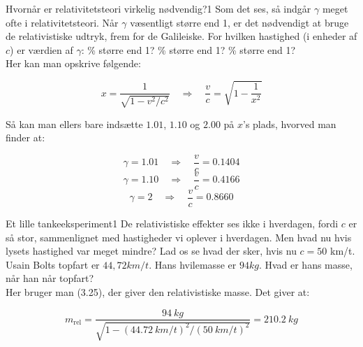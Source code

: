 \begin{opgave}{Hvornår er relativitetsteori virkelig nødvendig?}{1}
	Som det ses, så indgår $\gamma$ meget ofte i relativitetsteori. Når $\gamma$ væsentligt større end 1, er det
	nødvendigt at bruge de relativistiske udtryk, frem for de Galileiske. For hvilken hastighed (i enheder af $c$) er
	værdien af $\gamma$:
	\% større end 1?
	\% større end 1?
	\% større end 1?\\
	
	Her kan man opskrive følgende:
	
	$$x = \frac{1}{\sqrt{1- v^2/c^2}} \quad \Rightarrow \quad \frac{v}{c} = \sqrt{1- \frac{1}{x^2}}$$
	
	
	\noindent
	Så kan man ellers bare indsætte $1.01$, $1.10$ og $2.00$ på $x$'s plads, hvorved man finder at:
	
	$$\gamma = 1.01 \quad \Rightarrow \quad \frac{v}{c} = 0.1404 $$
	$$\gamma = 1.10 \quad \Rightarrow \quad \frac{v}{c} = 0.4166 $$
	$$\gamma = 2 \quad \Rightarrow \quad \frac{v}{c} = 0.8660 $$
\end{opgave}

\begin{opgave}{Et lille tankeeksperiment}{1}
	De relativistiske effekter ses ikke i hverdagen, fordi $c$ er så stor, sammenlignet med hastigheder vi oplever i
	hverdagen. Men hvad nu hvis lysets hastighed var meget mindre? Lad os se hvad der sker, hvis nu $c = 50$
	km/t.
	\opg Usain Bolts topfart er $44,72 \si{km/t}$. Hans hvilemasse er $94 \si{kg}$. Hvad er hans masse, når han når
	topfart?\\
	
	Her bruger man (3.25), der giver den relativistiske masse. Det giver at:
	
	$$m_{\text{rel}} = \frac{\SI{94}{kg}}{\sqrt{1- (\SI{44.72}{km/t})^2 / (\SI{50}{km/t})^2}} =  \SI{210.2}{kg} $$
\end{opgave}

